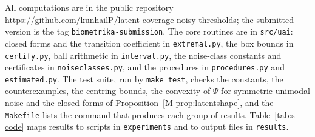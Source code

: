 \documentclass[11pt]{article}
\renewcommand{\_}{\usc\allowbreak}
\begin{document}
All computations are in the public repository\\ \url{https://github.com/kunhailP/latent-coverage-noisy-thresholds}; the submitted version is the tag \texttt{biometrika-submission}. The core routines are in \texttt{src/uai}: closed forms and the transition coefficient in \texttt{extremal.py}, the box bounds in \texttt{certify.py}, ball arithmetic in \texttt{interval.py}, the noise-class constants and certificates in \texttt{noise\_classes.py}, and the procedures in \texttt{procedures.py} and \texttt{estimated.py}. The test suite, run by \texttt{make test}, checks the constants, the counterexamples, the centring bounds, the convexity of $\Psi$ for symmetric unimodal noise and the closed forms of Proposition~\ref{M-prop:latentshape}, and the \texttt{Makefile} lists the command that produces each group of results. Table~\ref{tab:s-code} maps results to scripts in \texttt{experiments} and to output files in \texttt{results}.
\end{document}

